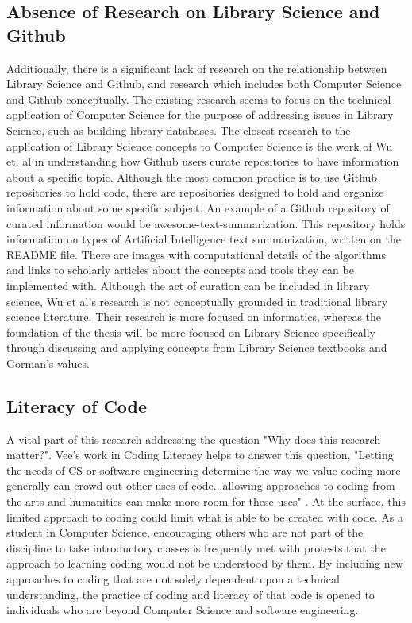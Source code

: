 \subsection{Absence of Research on Library Science and Github}

Additionally, there is a significant lack of research on the relationship between Library Science and Github, and research which includes both Computer Science and Github conceptually. The existing research seems to focus on the technical application of Computer Science for the purpose of addressing issues in Library Science, such as building library databases. The closest research to the application of Library Science concepts to Computer Science is the work of Wu et. al in understanding how Github users curate repositories to
have information about a specific topic\cite{wu2017github}. Although the most common practice is to use Github repositories to hold code, there are repositories designed to hold and organize information about some specific subject. An example of a Github repository of curated information would be awesome-text-summarization. This repository holds information on types of Artificial Intelligence text summarization, written on the README file\cite{awesomesum}. There are images with computational details of the algorithms and links to scholarly articles about the concepts and tools they can be implemented with. Although the act of curation can be included in library science, Wu et al's research is not conceptually grounded in traditional library science literature. Their research is more focused on informatics, whereas the foundation of the thesis will be more focused on Library Science specifically through discussing and applying concepts from Library Science textbooks and Gorman's values. 

\subsection{Literacy of Code}

A vital part of this research addressing the question "Why does this research matter?". Vee's work in Coding Literacy helps to answer this question,  "Letting the needs of CS or software engineering determine the way we value coding more generally can crowd out other uses of code...allowing approaches to coding from the arts and humanities can make more room for these uses" \cite{vee2017coding}. At the surface, this limited approach to coding could limit what is able to be created with code. As a student in Computer Science, encouraging others who are not part of the discipline to take introductory classes is frequently met with protests that the approach to learning coding would not be understood by them. By including new approaches to coding that are not solely dependent upon a technical understanding, the practice of coding and literacy of that code is opened to individuals who are beyond Computer Science and software engineering.

